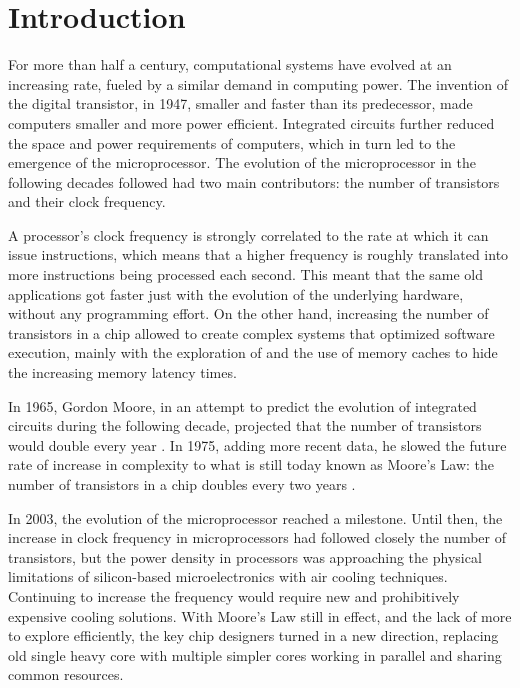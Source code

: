 \documentclass[../thesis]{subfiles}
\begin{document}
	\chapter{Introduction}
	\label{chp:intro}

	For more than half a century, computational systems have evolved at an increasing rate, fueled by a similar demand in computing power. The invention of the digital transistor, in 1947, smaller and faster than its predecessor, made computers smaller and more power efficient. Integrated circuits further reduced the space and power requirements of computers, which in turn led to the emergence of the microprocessor. The evolution of the microprocessor in the following decades followed had two main contributors: the number of transistors and their clock frequency.

	A processor's clock frequency is strongly correlated to the rate at which it can issue instructions, which means that a higher frequency is roughly translated into more instructions being processed each second. This meant that the same old applications got faster just with the evolution of the underlying hardware, without any programming effort. On the other hand, increasing the number of transistors in a chip allowed to create complex systems that optimized software execution, mainly with the exploration of \ilp and the use of memory caches to hide the increasing memory latency times.

	In 1965, Gordon Moore, in an attempt to predict the evolution of integrated circuits during the following decade, projected that the number of transistors would double every year \cite{Moore:1965}. In 1975, adding more recent data, he slowed the future rate of increase in complexity to what is still today known as Moore's Law: the number of transistors in a chip doubles every two years \cite{Moore:1975,ComputerHistory:Moore}.

	In 2003, the evolution of the microprocessor reached a milestone. Until then, the increase in clock frequency in microprocessors had followed closely the number of transistors, but the power density in processors was approaching the physical limitations of silicon-based microelectronics with air cooling techniques. Continuing to increase the frequency would require new and prohibitively expensive cooling solutions. With Moore's Law still in effect, and the lack of more \ilp to explore efficiently, the key \cpu chip designers turned in a new direction, replacing old single heavy core \cpus with multiple simpler cores working in parallel and sharing common resources.
\end{document}
